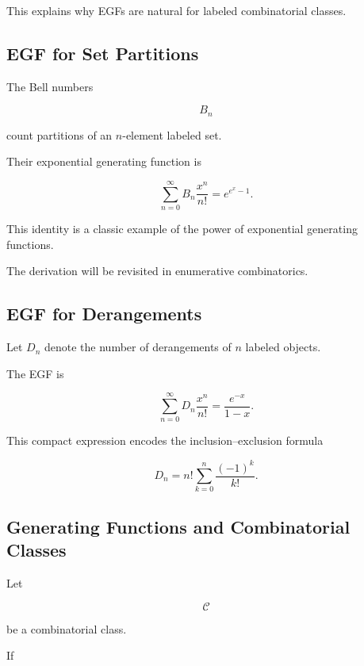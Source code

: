 This explains why EGFs are natural for labeled combinatorial classes.

\subsection{EGF for Set Partitions}
\label{subsec:egf-set-partitions-preview}

The Bell numbers

\[
B_n
\]

count partitions of an \(n\)-element labeled set.

Their exponential generating function is

\[
\boxed{
\sum_{n=0}^{\infty}
B_n\frac{x^n}{n!}
=
e^{e^x-1}.
}
\]

This identity is a classic example of the power of exponential
generating functions.

The derivation will be revisited in enumerative combinatorics.

\subsection{EGF for Derangements}
\label{subsec:egf-derangements}

Let \(D_n\) denote the number of derangements of \(n\) labeled objects.

The EGF is

\[
\boxed{
\sum_{n=0}^{\infty}
D_n\frac{x^n}{n!}
=
\frac{e^{-x}}{1-x}.
}
\]

This compact expression encodes the inclusion--exclusion formula

\[
D_n
=
n!
\sum_{k=0}^{n}\frac{(-1)^k}{k!}.
\]

\subsection{Generating Functions and Combinatorial Classes}
\label{subsec:gf-combinatorial-classes}

Let

\[
\mathcal{C}
\]

be a combinatorial class.

If

